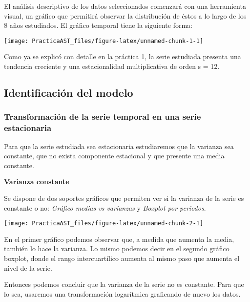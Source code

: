 \documentclass[
]{article}
\begin{document}
El análisis descriptivo de los datos seleccionados comenzará con una
herramienta visual, un gráfico que permitirá observar la distribución de
éstos a lo largo de los 8 años estudiados. El gráfico temporal tiene la
siguiente forma:

\begin{center}\texttt{[image: PracticaAST\_files/figure-latex/unnamed-chunk-1-1]} \end{center}

Como ya se explicó con detalle en la práctica 1, la serie estudiada
presenta una tendencia creciente y una estacionalidad multiplicativa de
orden s = 12.

\hypertarget{identificaciuxf3n-del-modelo}{%
\subsection{Identificación del
modelo}\label{identificaciuxf3n-del-modelo}}

\hypertarget{transformaciuxf3n-de-la-serie-temporal-en-una-serie-estacionaria}{%
\subsubsection{Transformación de la serie temporal en una serie
estacionaria}\label{transformaciuxf3n-de-la-serie-temporal-en-una-serie-estacionaria}}

Para que la serie estudiada sea estacionaria estudiaremos que la
varianza sea constante, que no exista componente estacional y que
presente una media constante.

\textbf{Varianza constante}

Se dispone de dos soportes gráficos que permiten ver si la varianza de
la serie es constante o no: \emph{Gráfico medias vs varianzas} y
\emph{Boxplot por periodos}.

\begin{center}\texttt{[image: PracticaAST\_files/figure-latex/unnamed-chunk-2-1]} \end{center}

En el primer gráfico podemos observar que, a medida que aumenta la
media, también lo hace la varianza. Lo mismo podemos decir en el segundo
gráfico boxplot, donde el rango intercuartílico aumenta al mismo paso
que aumenta el nivel de la serie.

Entonces podemos concluir que la varianza de la serie no es constante.
Para que lo sea, usaremos una transformación logarítmica graficando de
nuevo los datos.
\end{document}
